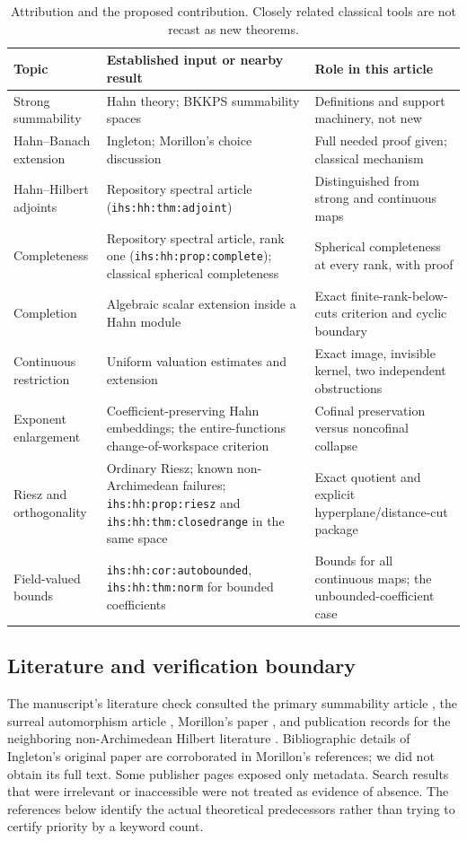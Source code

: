 \documentclass[11pt,letterpaper]{article}
\numberwithin{equation}{section}
\theoremstyle{definition}
\theoremstyle{remark}
\newcommand{\ihs}[1]{\texttt{ihs:#1}}
\begin{document}
\begin{table}[ht]
\centering\small
\begin{tabularx}{\textwidth}{@{}p{}YY@{}}
\toprule
Topic & Established input or nearby result & Role in this article\\
\midrule
Strong summability & Hahn theory; BKKPS summability spaces & Definitions and support machinery, not new\\
Hahn--Banach extension & Ingleton; Morillon's choice discussion & Full needed proof given; classical mechanism\\
Hahn--Hilbert adjoints & Repository spectral article (\ihs{hh:thm:adjoint}) & Distinguished from strong and continuous maps\\
Completeness & Repository spectral article, rank one (\ihs{hh:prop:complete}); classical spherical completeness & Spherical completeness at every rank, with proof\\
Completion & Algebraic scalar extension inside a Hahn module & Exact finite-rank-below-cuts criterion and cyclic boundary\\
Continuous restriction & Uniform valuation estimates and extension & Exact image, invisible kernel, two independent obstructions\\
Exponent enlargement & Coefficient-preserving Hahn embeddings; the entire-functions change-of-workspace criterion & Cofinal preservation versus noncofinal collapse\\
Riesz and orthogonality & Ordinary Riesz; known non-Archimedean failures; \ihs{hh:prop:riesz} and \ihs{hh:thm:closedrange} in the same space & Exact quotient and explicit hyperplane/distance-cut package\\
Field-valued bounds & \ihs{hh:cor:autobounded}, \ihs{hh:thm:norm} for bounded coefficients & Bounds for all continuous maps; the unbounded-coefficient case\\
\bottomrule
\end{tabularx}
\caption{Attribution and the proposed contribution. Closely related
classical tools are not recast as new theorems.}
\end{table}

\subsection{Literature and verification boundary}
The manuscript's literature check consulted the primary summability article
\cite{BKKPS}, the surreal automorphism article \cite{KKS}, Morillon's
paper \cite{Morillon}, and publication records for the neighboring
non-Archimedean Hilbert literature \cite{AN}. Bibliographic details of
Ingleton's original paper are corroborated in Morillon's references;
we did not obtain its full text. Some publisher pages exposed only
metadata. Search results that were irrelevant or inaccessible were not
treated as evidence of absence. The references below identify the
actual theoretical predecessors rather than trying to certify priority
by a keyword count.
\end{document}
